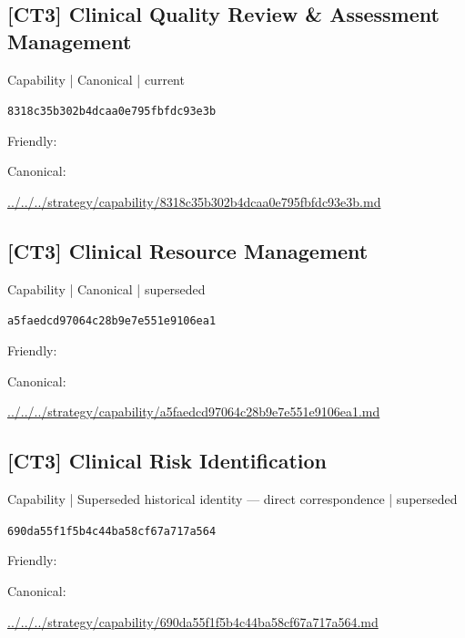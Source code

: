 \documentclass[10pt,a4paper]{article}
\begin{document}
\subsection*{[CT3] Clinical Quality Review \& Assessment Management}
{\small Capability | Canonical | current}\par
\texttt{8318c35b302b4dcaa0e795fbfdc93e3b}\par
Friendly: \par
Canonical: \par
{\footnotesize\url{../../../strategy/capability/8318c35b302b4dcaa0e795fbfdc93e3b.md}}\par
\subsection*{[CT3] Clinical Resource Management}
{\small Capability | Canonical | superseded}\par
\texttt{a5faedcd97064c28b9e7e551e9106ea1}\par
Friendly: \par
Canonical: \par
{\footnotesize\url{../../../strategy/capability/a5faedcd97064c28b9e7e551e9106ea1.md}}\par
\subsection*{[CT3] Clinical Risk Identification}
{\small Capability | Superseded historical identity — direct correspondence | superseded}\par
\texttt{690da55f1f5b4c44ba58cf67a717a564}\par
Friendly: \par
Canonical: \par
{\footnotesize\url{../../../strategy/capability/690da55f1f5b4c44ba58cf67a717a564.md}}\par
\end{document}
